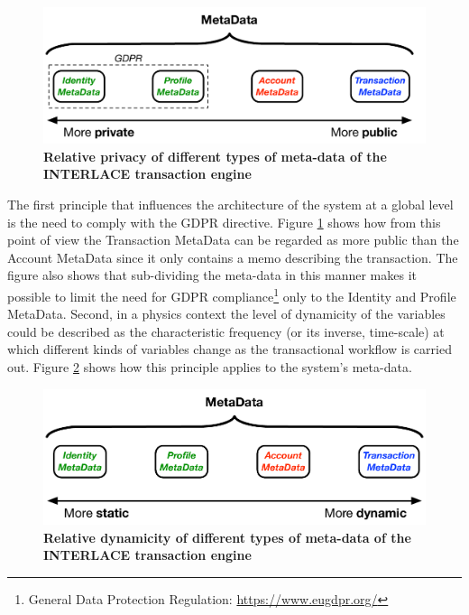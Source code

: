 \begin{figure}[h]
\vspace{-0.5cm}
\centering
\includegraphics[width=12cm]{Figures/Private_Public_MetaData}
\caption{\small\textbf{Relative privacy of different types of meta-data of the INTERLACE transaction engine}}
\label{fig:privatepublicmetaData}
\vspace{-0.5cm}
\end{figure}

The first principle that influences the architecture of the system at a global level is the need to comply with the GDPR directive. Figure \ref{fig:privatepublicmetaData} shows how from this point of view the Transaction MetaData can be regarded as more public than the Account MetaData since it only contains a memo describing the transaction. The figure also shows that sub-dividing the meta-data in this manner makes it possible to limit the need for GDPR compliance\footnote{General Data Protection Regulation: \url{https://www.eugdpr.org/}} only to the Identity and Profile MetaData. Second, in a physics context the level of dynamicity of the variables could be described as the characteristic frequency (or its inverse, time-scale) at which different kinds of variables change as the transactional workflow is carried out. Figure \ref{fig:staticdynamicmetadata} shows how this principle applies to the system's meta-data.

\begin{figure}[h]
\vspace{-0.5cm}
\centering
\includegraphics[width=12cm]{Figures/Static_Dynamic_MetaData}
\caption{\small\textbf{Relative dynamicity of different types of meta-data of the INTERLACE transaction engine}}
\label{fig:staticdynamicmetadata}
\vspace{-0.5cm}
\end{figure}

